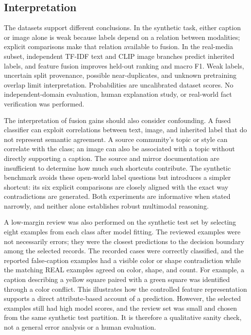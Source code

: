 \documentclass[conference]{IEEEtran}
\begin{document}
\subsection{Interpretation}
The datasets support different conclusions. In the synthetic task, either caption or image alone is weak because labels depend on a relation between modalities; explicit comparisons make that relation available to fusion. In the real-media subset, independent TF-IDF text and CLIP image branches predict inherited labels, and feature fusion improves held-out ranking and macro F1. Weak labels, uncertain split provenance, possible near-duplicates, and unknown pretraining overlap limit interpretation. Probabilities are uncalibrated dataset scores. No independent-domain evaluation, human explanation study, or real-world fact verification was performed.

The interpretation of fusion gains should also consider confounding. A fused classifier can exploit correlations between text, image, and inherited label that do not represent semantic agreement. A source community's topic or style can correlate with the class; an image can also be associated with a topic without directly supporting a caption. The source and mirror documentation are insufficient to determine how much such shortcuts contribute. The synthetic benchmark avoids these open-world label questions but introduces a simpler shortcut: its six explicit comparisons are closely aligned with the exact way contradictions are generated. Both experiments are informative when stated narrowly, and neither alone establishes robust multimodal reasoning.

A low-margin review was also performed on the synthetic test set by selecting eight examples from each class after model fitting. The reviewed examples were not necessarily errors; they were the closest predictions to the decision boundary among the selected records. The recorded cases were correctly classified, and the reported false-caption examples had a visible color or shape contradiction while the matching REAL examples agreed on color, shape, and count. For example, a caption describing a yellow square paired with a green square was identified through a color conflict. This illustrates how the controlled feature representation supports a direct attribute-based account of a prediction. However, the selected examples still had high model scores, and the review set was small and chosen from the same synthetic test partition. It is therefore a qualitative sanity check, not a general error analysis or a human evaluation.
\end{document}
